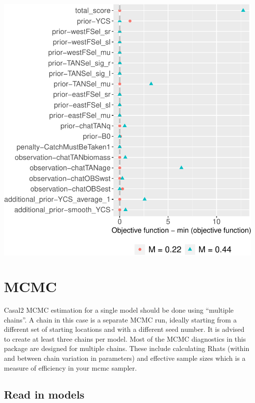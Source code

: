 \documentclass[
]{book}
\begin{document}
\includegraphics{_main_files/figure-latex/obj_plot-1.pdf}

\hypertarget{mcmc}{%
\chapter{MCMC}\label{mcmc}}

Casal2 MCMC estimation for a single model should be done using ``multiple chains''. A chain in this case is a separate MCMC run, ideally starting from a different set of starting locations and with a different seed number. It is advised to create at least three chains per model. Most of the MCMC diagnostics in this package are designed for multiple chains. These include calculating Rhats (within and between chain variation in parameters) \citep{vehtari2021rank} and effective sample sizes which is a measure of efficiency in your mcmc sampler.

\hypertarget{read-in-models-1}{%
\section{Read in models}\label{read-in-models-1}}
\end{document}
